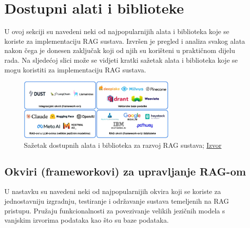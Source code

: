 \documentclass[]{foi}
\begin{document}




\newpage
\section{Dostupni alati i biblioteke}

U ovoj sekciji su navedeni neki od najpopularnijih alata i biblioteka koje se koriste za implementaciju RAG sustava. 
Izvršen je pregled i analiza svakog alata nakon čega je donesen zaključak koji od njih su korišteni u praktičnom dijelu rada.
Na sljedećoj slici može se vidjeti kratki sažetak alata i biblioteka koje se mogu koristiti za implementaciju RAG sustava.

\begin{figure}[h]
  \centering
  \includegraphics[width=0.7\textwidth]{./assets/sazetak_dostupni_alati.png}
  \caption{Sažetak dostupnih alata i biblioteka za razvoj RAG sustava; \href{https://tinyurl.com/eae6swbk}{Izvor}}
  \label{fig:slika9}
\end{figure}







\subsection{Okviri (frameworkovi) za upravljanje RAG-om}
U nastavku su navedeni neki od najpopularnijih okvira koji se koriste za jednostavniju izgradnju, testiranje i održavanje sustava temeljenih
na RAG pristupu. Pružaju funkcionalnosti za povezivanje velikih jezičnih modela s vanjskim izvorima podataka kao što su baze podataka.
\end{document}
